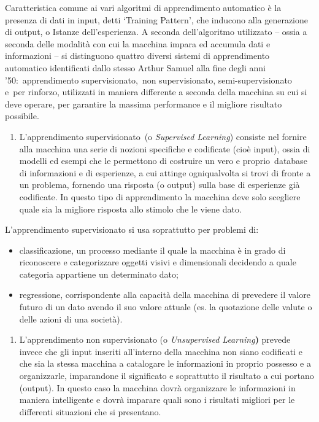 {Caratteristica comune ai vari algoritmi di apprendimento automatico è la
presenza di dati in input, detti `Training Pattern', che inducono alla
generazione di output, o Istanze dell'esperienza. A seconda
dell'algoritmo utilizzato -- ossia a seconda delle modalità con cui la
macchina impara ed accumula dati e informazioni -- si distinguono
quattro diversi sistemi di apprendimento automatico identificati dallo
stesso Arthur Samuel alla fine degli anni '50:~apprendimento
supervisionato,~non supervisionato, semi-supervisionato e~per rinforzo,
utilizzati in maniera differente a seconda della macchina su cui si deve
operare, per garantire la massima performance e il migliore risultato
possibile.

\begin{enumerate}
\def\labelenumi{\arabic{enumi}.}
\item
  L'apprendimento supervisionato~(o \emph{Supervised Learning}) consiste
  nel fornire alla macchina una serie di nozioni specifiche e codificate
  (cioè input), ossia di modelli ed esempi che le permettono di
  costruire un vero e proprio~database di informazioni e di esperienze,
  a cui attinge ogniqualvolta si trovi di fronte a un problema, fornendo
  una risposta (o output) sulla base di esperienze già codificate. In
  questo tipo di apprendimento la macchina deve solo scegliere quale sia
  la migliore risposta allo stimolo che le viene dato.
\end{enumerate}

L'apprendimento supervisionato si usa soprattutto per problemi di:

\begin{itemize}
\item
  classificazione, un processo mediante il quale la macchina è in grado
  di riconoscere e categorizzare oggetti visivi e dimensionali decidendo
  a quale categoria appartiene un determinato dato;
\item
  regressione, corrispondente alla capacità della macchina di prevedere
  il valore futuro di un dato avendo il suo valore attuale (es. la
  quotazione delle valute o delle azioni di una società).
\end{itemize}

\begin{enumerate}
\def\labelenumi{\arabic{enumi}.}
\setcounter{enumi}{1}
\item
  L'apprendimento non supervisionato (o \emph{Unsupervised
  Learning}\textbf{)} prevede invece che gli input inseriti all'interno
  della macchina non siano codificati e che sia la stessa macchina a
  catalogare le informazioni in proprio possesso e a organizzarle,
  imparandone il significato e soprattutto il risultato a cui portano
  (output). In questo caso la macchina dovrà organizzare le informazioni
  in maniera intelligente e dovrà imparare quali sono i risultati
  migliori per le differenti situazioni che si presentano.
\end{enumerate}

}
